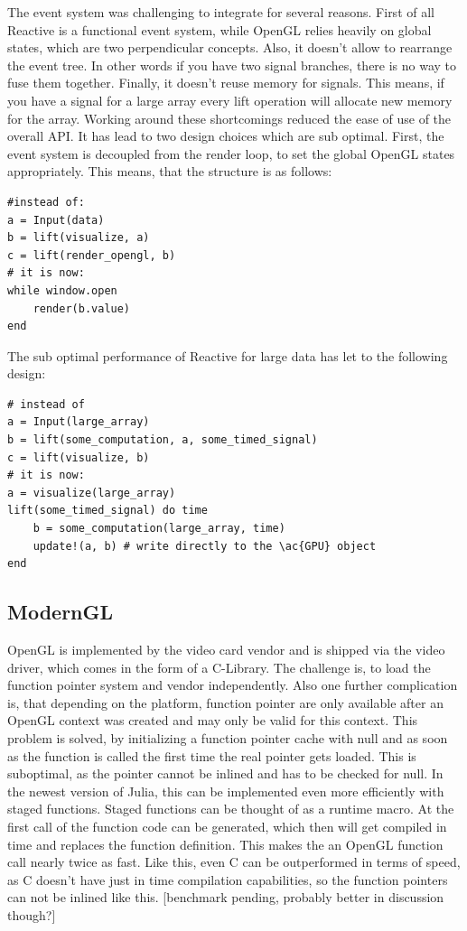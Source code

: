 The event system was challenging to integrate for several reasons.
First of all Reactive is a functional event system, while \ac{OpenGL} relies heavily on global states, which are two perpendicular concepts.
Also, it doesn't allow to rearrange the event tree. In other words if you have two signal branches, there is no way to fuse them together.
Finally, it doesn't reuse memory for signals. This means, if you have a signal for a large array every lift operation will allocate new memory for the array.
Working around these shortcomings reduced the ease of use of the overall API.
It has lead to two design choices which are sub optimal.
First, the event system is decoupled from the render loop, to set the global \ac{OpenGL} states appropriately.
This means, that the structure is as follows:
\begin{lstlisting}
#instead of:
a = Input(data)
b = lift(visualize, a)
c = lift(render_opengl, b)
# it is now:
while window.open
	render(b.value)
end
\end{lstlisting}
The sub optimal performance of Reactive for large data has let to the following design:
\begin{lstlisting}
# instead of
a = Input(large_array)
b = lift(some_computation, a, some_timed_signal)
c = lift(visualize, b)
# it is now:
a = visualize(large_array)
lift(some_timed_signal) do time
	b = some_computation(large_array, time)
	update!(a, b) # write directly to the \ac{GPU} object
end
\end{lstlisting}

\subsection{ModernGL}
\ac{OpenGL} is implemented by the video card vendor and is shipped via the video driver, which comes in the form of a C-Library.
The challenge is, to load the function pointer system and vendor independently. Also one further complication is, that depending on the platform, function pointer are only available after an \ac{OpenGL} context was created and may only be valid for this context. \cite{wgl}
This problem is solved, by initializing a function pointer cache with null and as soon as the function is called the first time the real pointer gets loaded. This is suboptimal, as the pointer cannot be inlined and has to be checked for null.
In the newest version of Julia, this can be implemented even more efficiently with staged functions. Staged functions can be thought of as a runtime macro.
At the first call of the function code can be generated, which then will get compiled in time and replaces the function definition. 
This makes the an \ac{OpenGL} function call nearly twice as fast.
Like this, even C can be outperformed in terms of speed, as C doesn't have just in time compilation capabilities, so the function pointers can not be inlined like this. [benchmark pending, probably better in discussion though?]


